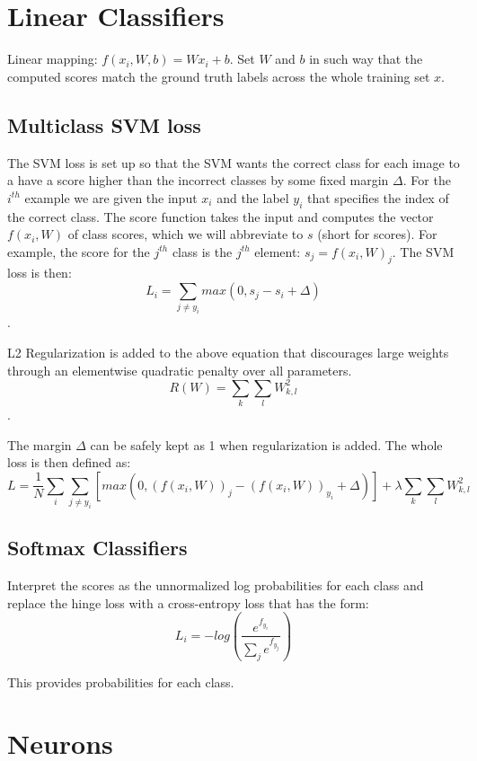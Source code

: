 \documentclass[letterpaper]{article}
\begin{document}
\section{Linear Classifiers}

Linear mapping: \(f(x_i, W, b) = Wx_i+b\). Set \(W\) and \(b\) in such way that the computed scores match the ground truth labels across the whole training set \(x\).

\subsection{Multiclass SVM loss}

The SVM loss is set up so that the SVM wants the correct class for each image to a have a score higher than the incorrect classes by some fixed margin $\Delta$. For the \(i^{th}\) example we are given the input \(x_i\) and the label \(y_i\) that specifies the index of the correct class. The score function takes the input and computes the vector \(f(x_i,W)\) of class scores, which we will abbreviate to \(s\) (short for scores). For example, the score for the \(j^{th}\) class is the \(j^{th}\) element: \(s_j=f(x_i,W)_j\). The SVM loss is then: 
\[L_i = \sum\limits_{j \neq y_i} max(0, s_j - s_i + \Delta)\]. 

L2 Regularization is added to the above equation that discourages large weights through an elementwise quadratic penalty over all parameters. 
\[R(W) = \sum\limits_{k} \sum\limits_{l} W_{k,l}^2\].

The margin $\Delta$ can be safely kept as 1 when regularization is added. The whole loss is then defined as: 
\[L = \frac{1}{N}\sum\limits_{i} \sum\limits_{j \neq y_i} [max(0, (f(x_i,W))_j - (f(x_i,W))_{y_i} + \Delta)] + \lambda\sum\limits_{k} \sum\limits_{l} W_{k,l}^2\]

\subsection{Softmax Classifiers}

Interpret the scores as the unnormalized log probabilities for each class and replace the hinge loss with a cross-entropy loss that has the form: 
\[L_i = -log(\frac{e^{f_{y_i}}}{\sum_{j} e^{f_{y_j}}})\]

This provides probabilities for each class. 

\section{Neurons}
\end{document}
